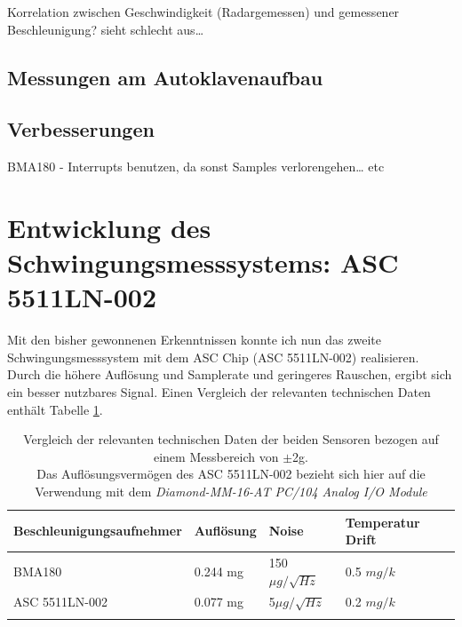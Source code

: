 \documentclass[12pt,a4paper]{scrartcl}
\begin{document}
Korrelation zwischen Geschwindigkeit (Radargemessen) und gemessener Beschleunigung? 
sieht schlecht aus…



\subsection{Messungen am Autoklavenaufbau}





\subsection{Verbesserungen}

BMA180 - Interrupts benutzen, da sonst Samples verlorengehen… etc



\newpage
\section{Entwicklung des Schwingungsmesssystems: ASC 5511LN-002}


Mit den bisher gewonnenen Erkenntnissen konnte ich nun das zweite Schwingungsmesssystem mit dem ASC Chip (ASC 5511LN-002) realisieren. Durch die höhere Auflösung und Samplerate und geringeres Rauschen, ergibt sich ein besser nutzbares Signal. Einen Vergleich der relevanten technischen Daten enthält Tabelle \ref{sensorcompare}.

\begin{table}[ht]
\begin{tabular}{@{}llll@{}}    
      			\cmidrule(r){1-4}\morecmidrules\cmidrule(r){1-4}
       			Beschleunigungsaufnehmer & Auflösung & Noise & Temperatur Drift\\
      			\midrule
 			BMA180 				   & 0.244 mg  & 150$\mu g / \sqrt{Hz}$ & 0.5 $mg/k$ \\ 
 			ASC 5511LN-002 		   & 0.077 mg  &    5$\mu g / \sqrt{Hz}$  & 0.2 $mg/k$\\
 		
   			\addlinespace
   			\bottomrule
 \end{tabular}
 \caption{Vergleich der relevanten technischen Daten der beiden Sensoren bezogen auf einem Messbereich von $\pm$2g.\\ Das Auflösungsvermögen des ASC 5511LN-002 bezieht sich hier auf die Verwendung mit  dem \textit{Diamond-MM-16-AT PC/104 Analog I/O Module}}
 \label{sensorcompare}
\end{table}
\end{document}
